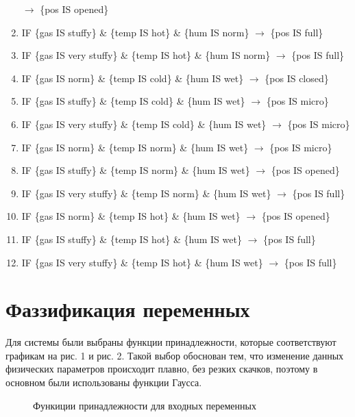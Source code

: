 \documentclass[a4paper]{article}
\begin{document}
\begin{enumerate}
    	$\rightarrow$ \{pos IS opened\}
    \item IF \{gas IS stuffy\} \& \{temp IS hot\} \& \{hum IS norm\} 
    	$\rightarrow$ \{pos IS full\}
    \item IF \{gas IS very stuffy\} \& \{temp IS hot\} \& \{hum IS norm\} 
	    $\rightarrow$ \{pos IS full\}
    \item IF \{gas IS norm\} \& \{temp IS cold\} \& \{hum IS wet\} 
    	$\rightarrow$ \{pos IS closed\}
    \item IF \{gas IS stuffy\} \& \{temp IS cold\} \& \{hum IS wet\} 
	    $\rightarrow$ \{pos IS micro\}
    \item IF \{gas IS very stuffy\} \& \{temp IS cold\} \& \{hum IS wet\} 
    	$\rightarrow$ \{pos IS micro\}
    \item IF \{gas IS norm\} \& \{temp IS norm\} \& \{hum IS wet\} 
	    $\rightarrow$ \{pos IS micro\}
    \item IF \{gas IS stuffy\} \& \{temp IS norm\} \& \{hum IS wet\} 
    	$\rightarrow$ \{pos IS opened\}
    \item IF \{gas IS very stuffy\} \& \{temp IS norm\} \& \{hum IS wet\} 
	    $\rightarrow$ \{pos IS full\}
    \item IF \{gas IS norm\} \& \{temp IS hot\} \& \{hum IS wet\} 
	    $\rightarrow$ \{pos IS opened\}
    \item IF \{gas IS stuffy\} \& \{temp IS hot\} \& \{hum IS wet\} 
    	$\rightarrow$ \{pos IS full\}
    \item IF \{gas IS very stuffy\} \& \{temp IS hot\} \& \{hum IS wet\} 
        $\rightarrow$ \{pos IS full\}
\end{enumerate}

\section{Фаззификация переменных}
Для системы были выбраны функции принадлежности, которые соответствуют
графикам на рис. 1 и рис. 2. Такой выбор обоснован тем, что изменение
данных физических параметров происходит плавно, без резких скачков, поэтому
в основном были использованы функции Гаусса. 

\begin{figure}[h]
    \caption{Функиции принадлежности для входных переменных} 
\end{figure}
\end{document}
